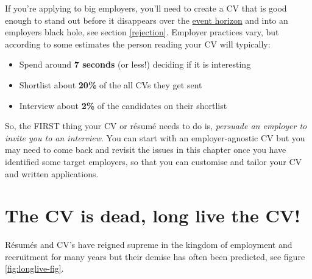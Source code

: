 \documentclass[
]{book}
\providecommand{\tightlist}{%
  \setlength{\itemsep}{0pt}\setlength{\parskip}{0pt}}
\begin{document}
If you're applying to big employers, you'll need to create a CV that is good enough to stand out before it disappears over the \href{https://en.wikipedia.org/wiki/Event_horizon}{event horizon} and into an employers black hole, see section \ref{rejection}. Employer practices vary, but according to some estimates the person reading your CV will typically:

\begin{itemize}
\tightlist
\item
  Spend around \textbf{7 seconds} (or less!) deciding if it is interesting
\item
  Shortlist about \textbf{20\%} of the all CVs they get sent
\item
  Interview about \textbf{2\%} of the candidates on their shortlist
\end{itemize}

So, the FIRST thing your CV or résumé needs to do is, \emph{persuade an employer to invite you to an interview}. You can start with an employer-agnostic CV but you may need to come back and revisit the issues in this chapter once you have identified some target employers, so that you can customise and tailor your CV and written applications.

\hypertarget{dead}{%
\section{The CV is dead, long live the CV!}\label{dead}}

Résumés and CV's have reigned supreme in the kingdom of employment and recruitment for many years but their demise has often been predicted, see figure \ref{fig:longlive-fig}.
\end{document}
